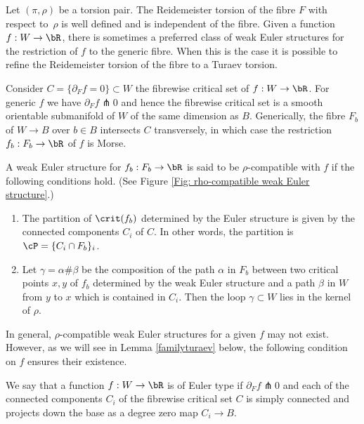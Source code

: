 Let $(\pi,\rho)$ be a torsion pair. The Reidemeister torsion of the fibre $F$ with respect to~$\rho$ is well defined and is independent of the fibre. Given a function $f:W \to \bR$, there is sometimes a preferred class of weak Euler structures for the restriction of $f$ to the generic fibre. When this is the case it is possible to refine the Reidemeister torsion of the fibre to a Turaev torsion.

Consider $C=\{ \partial_F f = 0 \} \subset W$ the fibrewise critical set of $f:W \to \bR$. For generic $f$ we have $\partial_F f \pitchfork 0$ and hence the fibrewise critical set is a smooth orientable submanifold of $W$ of the same dimension as $B$. Generically, the fibre $F_b$ of $W \to B$ over $b \in B$ intersects $C$ transversely, in which case the restriction $f_b: F_b \to \bR$ of $f$ is Morse.

\begin{definition}\label{def:317}
A weak Euler structure for $f_b:F_b \to \bR$ is said to be $\rho$-compatible with $f$ if the following conditions hold. (See Figure \ref{Fig: rho-compatible weak Euler structure}.)
\begin{enumerate}
\item\label{def:3171}
The partition of $\crit(f_b)$ determined by the Euler structure is given by the connected components $C_i$ of $C$. In other words, the partition is $\cP= \{ C_i \cap F_b \}_i$.
\item\label{def:3172}
Let $\gamma= \alpha \# \beta$ be the composition of the path $\alpha$ in $F_b$ between two critical points $x,y$ of $f_b$ determined by the weak Euler structure and a path $\beta$ in $W$ from $y$ to $x$ which is contained in $C_i$. Then the loop $\gamma \subset W$ lies in the kernel of $\rho$.
\end{enumerate}
\end{definition}

In general, $\rho$-compatible weak Euler structures for a given $f$ may not exist. However, as we will see in Lemma \ref{familyturaev} below, the following condition on $f$ ensures their existence.

\begin{definition}\label{Def: function euler}
We say that a function $f:W \to \bR$ is of Euler type if $\partial_F f \pitchfork 0$ and each of the connected components $C_i$ of the fibrewise critical set $C$ is simply connected and projects down the base as a degree zero map $C_i \to B$.
\end{definition}

